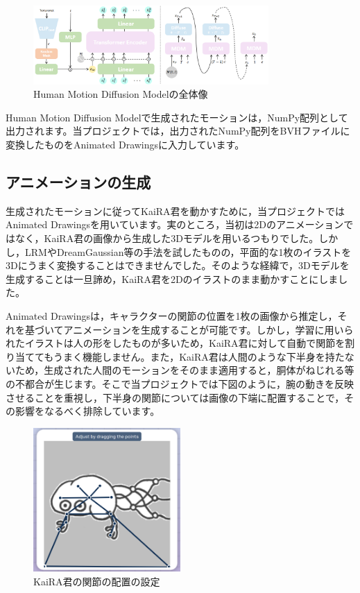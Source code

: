 \begin{figure}[htbp]
    \centering
    \includegraphics[width=0.8\textwidth]{moving-kaira-kun/fig/hdm_overview.png}
    \caption{Human Motion Diffusion Modelの全体像}
    \label{fig:hdm_overview}
\end{figure}

Human Motion Diffusion Modelで生成されたモーションは，NumPy配列として出力されます。当プロジェクトでは，出力されたNumPy配列をBVHファイルに変換したものをAnimated Drawingsに入力しています。

\subsection{アニメーションの生成}

生成されたモーションに従ってKaiRA君を動かすために，当プロジェクトではAnimated Drawings\cite{smith2023methodanimatingchildrensdrawings}を用いています。実のところ，当初は2Dのアニメーションではなく，KaiRA君の画像から生成した3Dモデルを用いるつもりでした。しかし，LRM\cite{hong2024lrmlargereconstructionmodel}やDreamGaussian\cite{tang2024dreamgaussiangenerativegaussiansplatting}等の手法を試したものの，平面的な1枚のイラストを3Dにうまく変換することはできませんでした。そのような経緯で，3Dモデルを生成することは一旦諦め，KaiRA君を2Dのイラストのまま動かすことにしました。

Animated Drawingsは，キャラクターの関節の位置を1枚の画像から推定し，それを基づいてアニメーションを生成することが可能です。しかし，学習に用いられたイラストは人の形をしたものが多いため，KaiRA君に対して自動で関節を割り当ててもうまく機能しません。また，KaiRA君は人間のような下半身を持たないため，生成された人間のモーションをそのまま適用すると，胴体がねじれる等の不都合が生じます。そこで当プロジェクトでは下図のように，腕の動きを反映させることを重視し，下半身の関節については画像の下端に配置することで，その影響をなるべく排除しています。

\begin{figure}[htbp]
    \centering
    \includegraphics[width=0.5\textwidth]{moving-kaira-kun/fig/kaira_kun_animated_drawings.png}
    \caption{KaiRA君の関節の配置の設定}
    \label{fig:kaira_kun_animated}
\end{figure}

